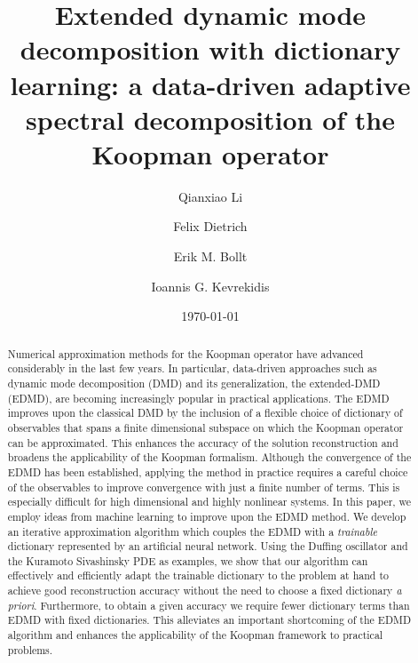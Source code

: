 \documentclass[%
 aip,
 cha,
 sd,%
 amsmath,amssymb,
 preprint,%
]{revtex4-1}
\begin{document}

\title{Extended dynamic mode decomposition with dictionary learning: a data-driven adaptive spectral decomposition of the Koopman operator}

\author{Qianxiao Li}
\author{Felix Dietrich}%
%
\author{Erik M. Bollt}%
%

\author{Ioannis G. Kevrekidis}
%

\date{\today}%

\begin{abstract}
Numerical approximation methods for the Koopman operator have advanced considerably in the last few years. In particular, data-driven approaches such as dynamic mode decomposition (DMD) and its generalization, the extended-DMD (EDMD), are becoming increasingly popular in practical applications.
The EDMD improves upon the classical DMD by the inclusion of a flexible choice of dictionary of observables that spans a finite dimensional subspace on which the Koopman operator can be approximated. This enhances the accuracy of the solution reconstruction and broadens the applicability of the Koopman formalism. Although the convergence of the EDMD has been established, applying the method in practice requires a careful choice of the observables to improve convergence with just a finite number of terms. This is especially difficult for high dimensional and highly nonlinear systems. In this paper, we employ ideas from machine learning to improve upon the EDMD method.
We develop an iterative approximation algorithm which couples the EDMD with a {\it trainable} dictionary represented by an artificial neural network. Using the Duffing oscillator and the Kuramoto Sivashinsky PDE as examples, we show that our algorithm can effectively and efficiently adapt the trainable dictionary to the problem at hand to achieve good reconstruction accuracy without the need to choose a fixed dictionary {\it a priori}. Furthermore, to obtain a given accuracy we require fewer dictionary terms than EDMD with fixed dictionaries. This alleviates an important shortcoming of the EDMD algorithm and enhances the applicability of the Koopman framework to practical problems. 
\end{abstract}
\end{document}
